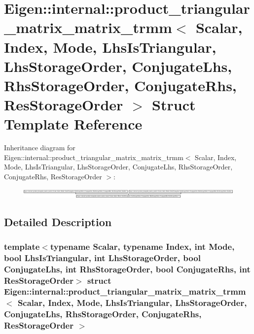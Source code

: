\hypertarget{struct_eigen_1_1internal_1_1product__triangular__matrix__matrix__trmm}{}\section{Eigen\+:\+:internal\+:\+:product\+\_\+triangular\+\_\+matrix\+\_\+matrix\+\_\+trmm$<$ Scalar, Index, Mode, Lhs\+Is\+Triangular, Lhs\+Storage\+Order, Conjugate\+Lhs, Rhs\+Storage\+Order, Conjugate\+Rhs, Res\+Storage\+Order $>$ Struct Template Reference}
\label{struct_eigen_1_1internal_1_1product__triangular__matrix__matrix__trmm}
Inheritance diagram for Eigen\+:\+:internal\+:\+:product\+\_\+triangular\+\_\+matrix\+\_\+matrix\+\_\+trmm$<$ Scalar, Index, Mode, Lhs\+Is\+Triangular, Lhs\+Storage\+Order, Conjugate\+Lhs, Rhs\+Storage\+Order, Conjugate\+Rhs, Res\+Storage\+Order $>$\+:\begin{figure}[H]
\begin{center}
\leavevmode
\includegraphics[height=0.525328cm]{struct_eigen_1_1internal_1_1product__triangular__matrix__matrix__trmm}
\end{center}
\end{figure}


\subsection{Detailed Description}
\subsubsection*{template$<$typename Scalar, typename Index, int Mode, bool Lhs\+Is\+Triangular, int Lhs\+Storage\+Order, bool Conjugate\+Lhs, int Rhs\+Storage\+Order, bool Conjugate\+Rhs, int Res\+Storage\+Order$>$\newline
struct Eigen\+::internal\+::product\+\_\+triangular\+\_\+matrix\+\_\+matrix\+\_\+trmm$<$ Scalar, Index, Mode, Lhs\+Is\+Triangular, Lhs\+Storage\+Order, Conjugate\+Lhs, Rhs\+Storage\+Order, Conjugate\+Rhs, Res\+Storage\+Order $>$}



